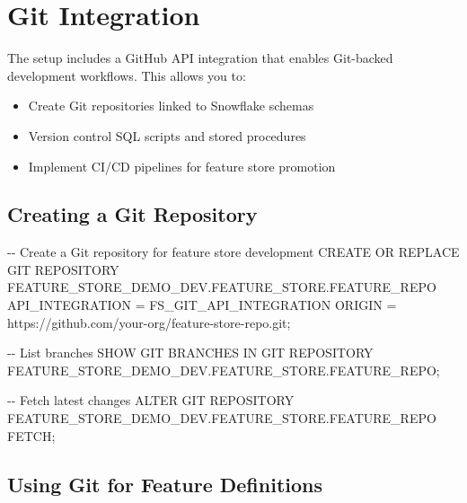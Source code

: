 \documentclass[
  letterpaper,
  DIV=11,
  numbers=noendperiod]{scrreprt}
\newenvironment{Shaded}{\begin{snugshade}}{\end{snugshade}}
\newcommand{\CommentTok}[1]{\textcolor[rgb]{0.37,0.37,0.37}{#1}}
\newcommand{\KeywordTok}[1]{\textcolor[rgb]{0.00,0.23,0.31}{#1}}
\newcommand{\NormalTok}[1]{\textcolor[rgb]{0.00,0.23,0.31}{#1}}
\newcommand{\OperatorTok}[1]{\textcolor[rgb]{0.37,0.37,0.37}{#1}}
\newcommand{\StringTok}[1]{\textcolor[rgb]{0.13,0.47,0.30}{#1}}
\providecommand{\tightlist}{%
  \setlength{\itemsep}{0pt}\setlength{\parskip}{0pt}}\usepackage{longtable,booktabs,array}
\begin{document}
\hypertarget{git-integration}{%
\section{Git Integration}\label{git-integration}}

The setup includes a GitHub API integration that enables Git-backed
development workflows. This allows you to:

\begin{itemize}
\tightlist
\item
  Create Git repositories linked to Snowflake schemas
\item
  Version control SQL scripts and stored procedures
\item
  Implement CI/CD pipelines for feature store promotion
\end{itemize}

\hypertarget{creating-a-git-repository}{%
\subsection{Creating a Git Repository}\label{creating-a-git-repository}}

\begin{Shaded}
\begin{Highlighting}[]
\CommentTok{{-}{-} Create a Git repository for feature store development}
\KeywordTok{CREATE} \KeywordTok{OR} \KeywordTok{REPLACE}\NormalTok{ GIT REPOSITORY FEATURE\_STORE\_DEMO\_DEV.FEATURE\_STORE.FEATURE\_REPO}
\NormalTok{    API\_INTEGRATION }\OperatorTok{=}\NormalTok{ FS\_GIT\_API\_INTEGRATION}
\NormalTok{    ORIGIN }\OperatorTok{=} \StringTok{\textquotesingle{}https://github.com/your{-}org/feature{-}store{-}repo.git\textquotesingle{}}\NormalTok{;}

\CommentTok{{-}{-} List branches}
\NormalTok{SHOW GIT BRANCHES }\KeywordTok{IN}\NormalTok{ GIT REPOSITORY FEATURE\_STORE\_DEMO\_DEV.FEATURE\_STORE.FEATURE\_REPO;}

\CommentTok{{-}{-} Fetch latest changes}
\KeywordTok{ALTER}\NormalTok{ GIT REPOSITORY FEATURE\_STORE\_DEMO\_DEV.FEATURE\_STORE.FEATURE\_REPO FETCH;}
\end{Highlighting}
\end{Shaded}

\hypertarget{using-git-for-feature-definitions}{%
\subsection{Using Git for Feature
Definitions}\label{using-git-for-feature-definitions}}
\end{document}
